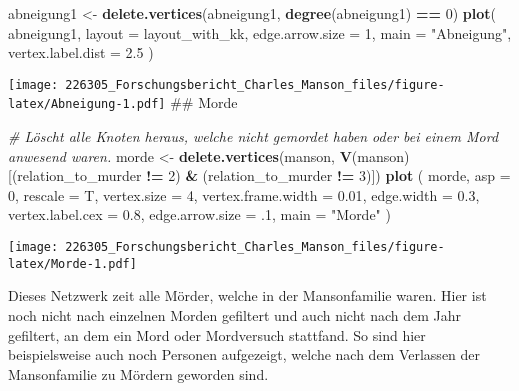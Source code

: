 \documentclass[
]{article}
\newenvironment{Shaded}{\begin{snugshade}}{\end{snugshade}}
\newcommand{\CommentTok}[1]{\textcolor[rgb]{0.56,0.35,0.01}{\textit{#1}}}
\newcommand{\DataTypeTok}[1]{\textcolor[rgb]{0.13,0.29,0.53}{#1}}
\newcommand{\DecValTok}[1]{\textcolor[rgb]{0.00,0.00,0.81}{#1}}
\newcommand{\FloatTok}[1]{\textcolor[rgb]{0.00,0.00,0.81}{#1}}
\newcommand{\KeywordTok}[1]{\textcolor[rgb]{0.13,0.29,0.53}{\textbf{#1}}}
\newcommand{\NormalTok}[1]{#1}
\newcommand{\OperatorTok}[1]{\textcolor[rgb]{0.81,0.36,0.00}{\textbf{#1}}}
\newcommand{\StringTok}[1]{\textcolor[rgb]{0.31,0.60,0.02}{#1}}
\begin{document}
\begin{Shaded}
\begin{Highlighting}[]
\NormalTok{abneigung1 <-}\StringTok{ }\KeywordTok{delete.vertices}\NormalTok{(abneigung1, }\KeywordTok{degree}\NormalTok{(abneigung1) }\OperatorTok{==}\StringTok{ }\DecValTok{0}\NormalTok{)}
\KeywordTok{plot}\NormalTok{(}
\NormalTok{  abneigung1,}
  \DataTypeTok{layout =}\NormalTok{ layout_with_kk,}
  \DataTypeTok{edge.arrow.size =} \DecValTok{1}\NormalTok{,}
  \DataTypeTok{main =} \StringTok{"Abneigung"}\NormalTok{,}
  \DataTypeTok{vertex.label.dist =} \FloatTok{2.5}
\NormalTok{)}
\end{Highlighting}
\end{Shaded}

\texttt{[image: 226305\_Forschungsbericht\_Charles\_Manson\_files/figure-latex/Abneigung-1.pdf]}
\#\# Morde

\begin{Shaded}
\begin{Highlighting}[]
\CommentTok{# Löscht alle Knoten heraus, welche nicht gemordet haben oder bei einem Mord anwesend waren.}
\NormalTok{morde <-}
\StringTok{  }\KeywordTok{delete.vertices}\NormalTok{(manson, }\KeywordTok{V}\NormalTok{(manson)[(relation_to_murder }\OperatorTok{!=}\StringTok{ }\DecValTok{2}\NormalTok{) }\OperatorTok{&}
\StringTok{                                      }\NormalTok{(relation_to_murder }\OperatorTok{!=}\StringTok{ }\DecValTok{3}\NormalTok{)])}
\KeywordTok{plot}\NormalTok{ (}
\NormalTok{  morde,}
  \DataTypeTok{asp =} \DecValTok{0}\NormalTok{,}
  \DataTypeTok{rescale =}\NormalTok{ T,}
  \DataTypeTok{vertex.size =} \DecValTok{4}\NormalTok{,}
  \DataTypeTok{vertex.frame.width =} \FloatTok{0.01}\NormalTok{,}
  \DataTypeTok{edge.width =} \FloatTok{0.3}\NormalTok{,}
  \DataTypeTok{vertex.label.cex =} \FloatTok{0.8}\NormalTok{,}
  \DataTypeTok{edge.arrow.size =} \FloatTok{.1}\NormalTok{,}
  \DataTypeTok{main =} \StringTok{"Morde"}
\NormalTok{)}
\end{Highlighting}
\end{Shaded}

\texttt{[image: 226305\_Forschungsbericht\_Charles\_Manson\_files/figure-latex/Morde-1.pdf]}

Dieses Netzwerk zeit alle Mörder, welche in der Mansonfamilie waren.
Hier ist noch nicht nach einzelnen Morden gefiltert und auch nicht nach
dem Jahr gefiltert, an dem ein Mord oder Mordversuch stattfand. So sind
hier beispielsweise auch noch Personen aufgezeigt, welche nach dem
Verlassen der Mansonfamilie zu Mördern geworden sind.
\end{document}
